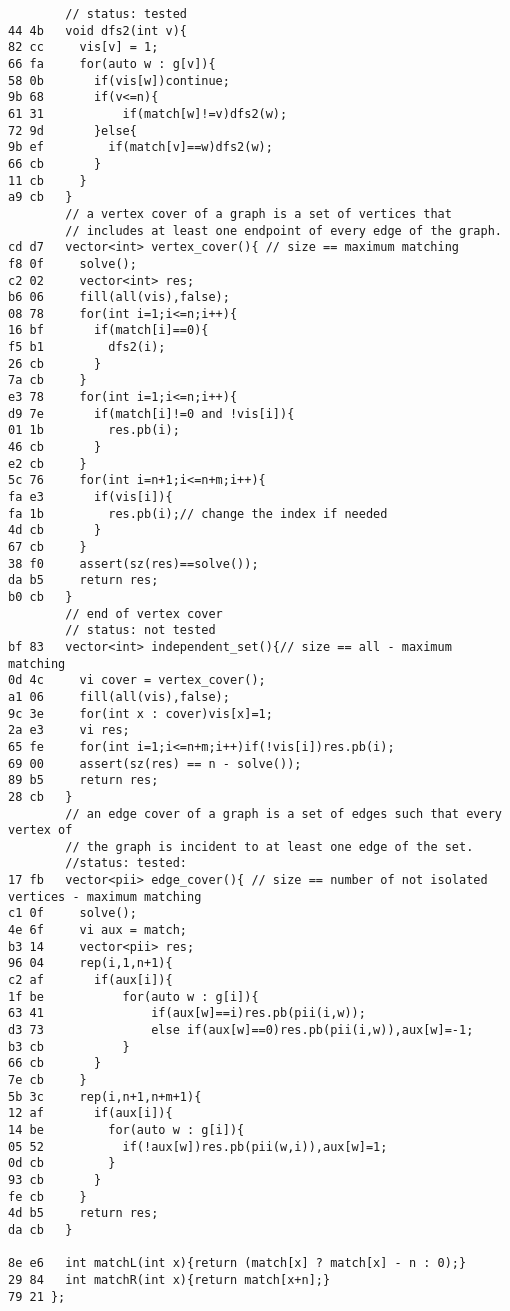 \documentclass[11pt, a4paper, twoside]{article}
\begin{document}
\begin{lstlisting}
        // status: tested
44 4b   void dfs2(int v){
82 cc     vis[v] = 1;
66 fa     for(auto w : g[v]){
58 0b       if(vis[w])continue;
9b 68       if(v<=n){
61 31           if(match[w]!=v)dfs2(w);
72 9d       }else{
9b ef         if(match[v]==w)dfs2(w);
66 cb       }
11 cb     }
a9 cb   }
        // a vertex cover of a graph is a set of vertices that 
        // includes at least one endpoint of every edge of the graph.
cd d7   vector<int> vertex_cover(){ // size == maximum matching
f8 0f     solve();
c2 02     vector<int> res;
b6 06     fill(all(vis),false);
08 78     for(int i=1;i<=n;i++){
16 bf       if(match[i]==0){
f5 b1         dfs2(i);
26 cb       }
7a cb     }
e3 78     for(int i=1;i<=n;i++){
d9 7e       if(match[i]!=0 and !vis[i]){
01 1b         res.pb(i);
46 cb       }
e2 cb     }
5c 76     for(int i=n+1;i<=n+m;i++){
fa e3       if(vis[i]){
fa 1b         res.pb(i);// change the index if needed
4d cb       }
67 cb     }
38 f0     assert(sz(res)==solve());
da b5     return res;
b0 cb   }
        // end of vertex cover
        // status: not tested
bf 83   vector<int> independent_set(){// size == all - maximum matching
0d 4c     vi cover = vertex_cover();
a1 06     fill(all(vis),false);
9c 3e     for(int x : cover)vis[x]=1;
2a e3     vi res;
65 fe     for(int i=1;i<=n+m;i++)if(!vis[i])res.pb(i);
69 00     assert(sz(res) == n - solve());
89 b5     return res;
28 cb   }
        // an edge cover of a graph is a set of edges such that every vertex of
        // the graph is incident to at least one edge of the set.
        //status: tested:
17 fb   vector<pii> edge_cover(){ // size == number of not isolated vertices - maximum matching
c1 0f     solve();
4e 6f     vi aux = match;
b3 14     vector<pii> res;
96 04     rep(i,1,n+1){
c2 af       if(aux[i]){
1f be           for(auto w : g[i]){
63 41               if(aux[w]==i)res.pb(pii(i,w));
d3 73               else if(aux[w]==0)res.pb(pii(i,w)),aux[w]=-1;
b3 cb           }
66 cb       }
7e cb     }
5b 3c     rep(i,n+1,n+m+1){
12 af       if(aux[i]){
14 be         for(auto w : g[i]){
05 52           if(!aux[w])res.pb(pii(w,i)),aux[w]=1;
0d cb         }
93 cb       }
fe cb     }
4d b5     return res;
da cb   }
      
8e e6   int matchL(int x){return (match[x] ? match[x] - n : 0);}
29 84   int matchR(int x){return match[x+n];}
79 21 };
\end{lstlisting}
\end{document}
